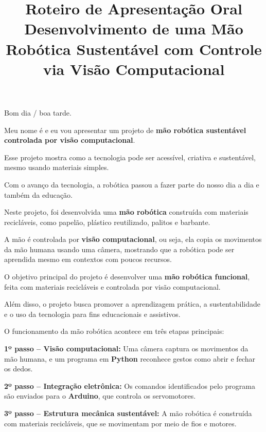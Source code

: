 \documentclass[12pt]{article}
\title{
\textcolor{roxo}{Roteiro de Apresentação Oral}\\
\textbf{\textcolor{azul}{Desenvolvimento de uma Mão Robótica Sustentável com Controle via Visão Computacional}}
}
\author{}
\date{}
\begin{document}
\maketitle

\onehalfspacing

\begin{tcolorbox}[colback=blue!5,colframe=azul,title=\textbf{Abertura}]
Bom dia / boa tarde.

Meu nome é \underline{\hspace{5cm}} e eu vou apresentar um projeto de \textbf{mão robótica sustentável controlada por visão computacional}.

Esse projeto mostra como a tecnologia pode ser acessível, criativa e sustentável, mesmo usando materiais simples.
\end{tcolorbox}

\begin{tcolorbox}[colback=green!5,colframe=verde,title=\textbf{Introdução}]
Com o avanço da tecnologia, a robótica passou a fazer parte do nosso dia a dia e também da educação.

Neste projeto, foi desenvolvida uma \textbf{mão robótica} construída com materiais recicláveis, como papelão, plástico reutilizado, palitos e barbante.

A mão é controlada por \textbf{visão computacional}, ou seja, ela copia os movimentos da mão humana usando uma câmera, mostrando que a robótica pode ser aprendida mesmo em contextos com poucos recursos.
\end{tcolorbox}

\begin{tcolorbox}[colback=orange!5,colframe=laranja,title=\textbf{Objetivo do Projeto}]
O objetivo principal do projeto é desenvolver uma \textbf{mão robótica funcional}, feita com materiais recicláveis e controlada por visão computacional.

Além disso, o projeto busca promover a aprendizagem prática, a sustentabilidade e o uso da tecnologia para fins educacionais e assistivos.
\end{tcolorbox}

\begin{tcolorbox}[colback=purple!5,colframe=roxo,title=\textbf{Como o Projeto Funciona}]
O funcionamento da mão robótica acontece em três etapas principais:

\textbf{1º passo -- Visão computacional:} Uma câmera captura os movimentos da mão humana, e um programa em \textbf{Python} reconhece gestos como abrir e fechar os dedos.

\textbf{2º passo -- Integração eletrônica:} Os comandos identificados pelo programa são enviados para o \textbf{Arduino}, que controla os servomotores.

\textbf{3º passo -- Estrutura mecânica sustentável:} A mão robótica é construída com materiais recicláveis, que se movimentam por meio de fios e motores.
\end{tcolorbox}
\end{document}
